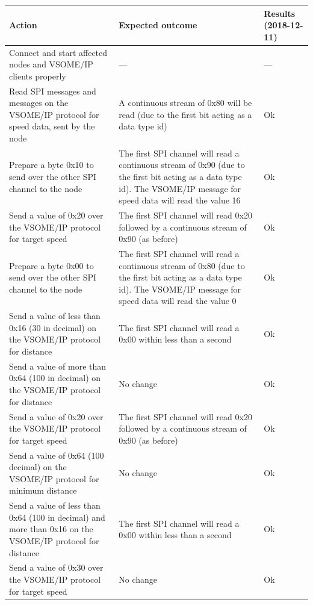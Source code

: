 \documentclass[11pt, titlepage]{article} %
\begin{document}
\begin{table}[H]
 \label{tab:title}
\centering
\begin{tabular}{|m{5cm}|m{5cm}|m{5cm}|}
\hline
Action & Expected outcome & Results (2018-12-11) \\ \hline
Connect and start affected nodes and VSOME/IP clients properly  &  ---     & ---  \\ \hline
Read SPI messages and messages on the VSOME/IP protocol for speed data, sent by the node  &  A continuous stream of 0x80 will be read (due to the first bit acting as a data type id)     & Ok  \\ \hline
Prepare a byte 0x10 to send over the other SPI channel to the node  &  The first SPI channel will read a continuous stream of 0x90 (due to the first bit acting as a data type id). 
The VSOME/IP message for speed data will read the value 16     & Ok  \\ \hline
Send a value of 0x20 over the VSOME/IP protocol for target speed  & The first SPI channel will read 0x20 followed by a continuous stream of 0x90 (as before)      & Ok  \\ \hline
Prepare a byte 0x00 to send over the other SPI channel to the node  & The first SPI channel will read a continuous stream of 0x80 (due to the first bit acting as a data type id). The VSOME/IP message for speed data will read the value 0
      & Ok  \\ \hline
Send a value of less than 0x16 (30 in decimal) on the VSOME/IP protocol for distance  & The first SPI channel will read a 0x00 within less than a second      & Ok  \\ \hline
Send a value of more than 0x64 (100 in decimal) on the VSOME/IP protocol for distance  & No change      & Ok  \\ \hline
Send a value of 0x20 over the VSOME/IP protocol for target speed  & The first SPI channel will read 0x20 followed by a continuous stream of 0x90 (as before)      & Ok  \\ \hline
Send a value of 0x64 (100 decimal) on the VSOME/IP protocol for minimum distance  & No change      & Ok  \\ \hline
Send a value of less than 0x64 (100 in decimal) and more than 0x16 on the VSOME/IP protocol for distance  &  The first SPI channel will read a 0x00 within less than a second     & Ok  \\ \hline
Send a value of 0x30 over the VSOME/IP protocol for target speed  &  No change     & Ok  \\ \hline

\end{tabular}
\end{table}
\end{document}
